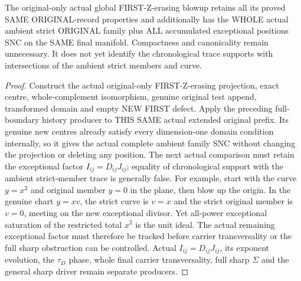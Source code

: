 \begin{theorem}
\label{hir:sharp-original-curve-first-defect-erasure-full-ambient-boundary}
\leanok
The original-only actual global FIRST-Z-erasing blowup retains all its
proved SAME ORIGINAL-record properties and additionally has the WHOLE
actual ambient strict ORIGINAL family plus ALL accumulated exceptional
positions SNC on the SAME final manifold. Compactness and canonicality
remain unnecessary. It does not yet identify the chronological trace
supports with intersections of the ambient strict members and curve.
\end{theorem}
\begin{proof}
Construct the actual original-only FIRST-Z-erasing projection, exact
centre, whole-complement isomorphism, genuine original test append,
transformed domain and empty NEW FIRST defect. Apply the preceding
full-boundary history producer to THIS SAME actual extended original
prefix. Its genuine new centres already satisfy every dimension-one
domain condition internally, so it gives the actual complete ambient
family SNC without changing the projection or deleting any position.
The next actual comparison must retain the exceptional factor
$I_{ij}=D_{ij}J_{ij}$; equality of chronological support with the ambient
strict-member trace is generally false. For example, start with the
curve $y=x^2$ and original member $y=0$ in the plane, then blow up the
origin. In the genuine chart $y=xv$, the strict curve is $v=x$ and the
strict original member is $v=0$, meeting on the new exceptional divisor.
Yet all-power exceptional saturation of the restricted total $x^2$ is
the unit ideal. The actual remaining exceptional factor must therefore
be tracked before carrier transversality or the full sharp obstruction
can be controlled. Actual $I_{ij}=D_{ij}J_{ij}$, its exponent evolution,
the $\tau_D$ phase, whole final carrier transversality, full sharp
$\Sigma$ and the general sharp driver remain separate producers.
\end{proof}
